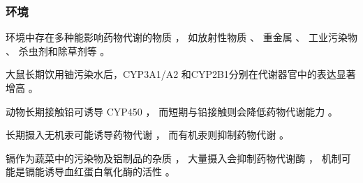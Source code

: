 \documentclass[dvipsnames, svgnames, x11names]{beamer}
\begin{document}
\begin{frame}
    \frametitle{环境}
    环境中存在多种能影响药物代谢的物质 ， 如放射性物质 、 重金属 、 工业污染物 、 杀虫剂和除草剂等 。
    \begin{blankblock}{}
      大鼠长期饮用铀污染水后，CYP3A1/A2 和CYP2B1分别在代谢器官中的表达显著增高 。 
      
      动物长期接触铅可诱导 CYP450 ， 而短期与铅接触则会降低药物代谢能力 。 
      
      长期摄入无机汞可能诱导药物代谢 ， 而有机汞则抑制药物代谢 。 
      
      镉作为蔬菜中的污染物及铝制品的杂质 ， 大量摄入会抑制药物代谢酶 ， 机制可能是镉能诱导血红蛋白氧化酶的活性 。
    \end{blankblock}
\end{frame}
\end{document}
